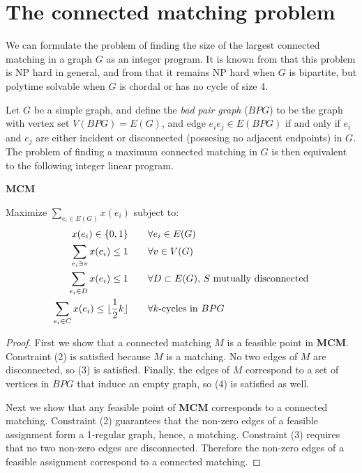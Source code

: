 %
%

\section{The connected matching problem}



We can formulate the problem of finding the size of the largest connected matching in a graph $G$ as an integer program.  It is known from \cite{MR2070161} that this problem is NP hard in general, and from \cite{MR2163948} that it remains NP hard when $G$ is bipartite, but polytime solvable when $G$ is chordal or has no cycle of size 4.  

Let $G$ be a simple graph, and define the \textit{bad pair graph} ($BPG$) to be the graph with vertex set $V(BPG) = E(G)$, and edge $e_ie_j \in E(BPG)$ if and only if $e_i$ and $e_j$ are either incident or disconnected (possesing no adjacent endpoints) in $G$.  The problem of finding a maximum connected matching in $G$ is then equivalent to the following integer linear program.

\noindent\textbf{MCM}

\noindent Maximize $\displaystyle \sum_{e_i \in E(G)} x(e_i)$ subject to: 
\begin{align}
	x(e_i) \in \{0,1\} \qquad &\forall e_i \in E(G)\\
	\sum_{e_i \ni v} x(e_i) \leq 1 \qquad &\forall v\in V(G)\\
	\sum_{e_i \in D} x(e_i) \leq 1 \qquad &\forall D\subset E(G)\makebox{, $S$ mutually disconnected}\\
	\sum_{e_i \in C} x(e_i) \leq \lfloor \frac{1}{2}k\rfloor \qquad& \forall \makebox{$k$-cycles in $BPG$}
\end{align} 
\begin{proof}
	First we show that a connected matching $M$ is a feasible point in \textbf{MCM}.  Constraint (2) is satisfied because $M$ is a matching.  No two edges of $M$ are disconnected, so (3) is satisfied.  Finally, the edges of $M$ correspond to a set of vertices in $BPG$ that induce an empty graph, so (4) is satisfied as well.

Next we show that any feasible point of \textbf{MCM} corresponds to a connected matching.  Constraint (2) guarantees that the non-zero edges of a feasible assignment form a 1-regular graph, hence, a matching.  Constraint (3) requires that no two non-zero edges are disconnected.  Therefore the non-zero edges of a feasible assignment correspond to a connected matching.    
\end{proof}


